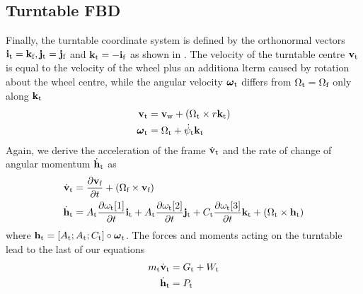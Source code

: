 \subsection{Turntable FBD}
Finally, the turntable coordinate system is defined by the orthonormal vectors $\mathbf{i}_{\text{t}} = \mathbf{k}_{\text{f}},\mathbf{j}_{\text{t}} = \mathbf{j}_{\text{f}}$ and $\mathbf{k}_{\text{t}} = -\mathbf{i}_{\text{f}}$  as shown in . The velocity of the turntable centre $\mathbf{v}_{\text{t}}$ is equal to the velocity of the wheel plus an additiona lterm caused by rotation about the wheel centre, while the angular velocity $\boldsymbol{\omega}_{\text{t}}$ differs from $\Omega_{\text{t}}=\Omega_{\text{f}}$ only along $\mathbf{k}_{\text{t}}$ 
\begin{align*}
\mathbf{v}_{\text{t}} &= \mathbf{v}_{\text{w}} + (\Omega_{\text{t}}\times r\mathbf{k}_{\text{t}}) \\
\boldsymbol{\omega}_{\text{t}} &= \Omega_{\text{t}} + \dot\psi_{\text{t}}\mathbf{k}_{\text{t}}
\end{align*}
Again, we derive the acceleration of the frame $\dot{\mathbf{v}}_{\text{t}}$ and the rate of change of angular momentum $\dot{\mathbf{h}}_{\text{t}}$ as
\begin{align*}
\dot{\mathbf{v}}_{\text{t}} &= \frac{\mathrm{\partial} \mathbf{v}_{\text{f}}}{\mathrm{\partial} t} + (\Omega_{\text{f}}\times \mathbf{v}_{\text{f}}) \\
\dot{\mathbf{h}}_{\text{t}} &= A_{\text{t}}\frac{\mathrm{\partial} \omega_{\text{t}}[1]}{\mathrm{\partial} t}\mathbf{i}_{\text{t}} + A_{\text{t}}\frac{\mathrm{\partial} \omega_{\text{t}}[2]}{\mathrm{\partial} t}\mathbf{j}_{\text{t}} + C_{\text{t}}\frac{\mathrm{\partial} \omega_{\text{t}}[3]}{\mathrm{\partial} t}\mathbf{k}_{\text{t}} +  (\Omega_{\text{t}}\times \mathbf{h}_{\text{t}})
\end{align*}
where $\mathbf{h}_{\text{t}} = [A_{\text{t}}; A_{\text{t}}; C_{\text{t}}] \circ \boldsymbol{\omega}_{\text{t}}$. The forces and moments acting on the turntable lead to the last of our equations
\begin{align}
m_{\text{t}}\dot{\mathbf{v}}_{\text{t}} &= G_{\text{t}} + W_{\text{t}} \label{eqn:tFBD1} \\
\dot{\mathbf{h}}_{\text{t}} &= P_{\text{t}} \label{eqn:tFBD2} 
\end{align}





